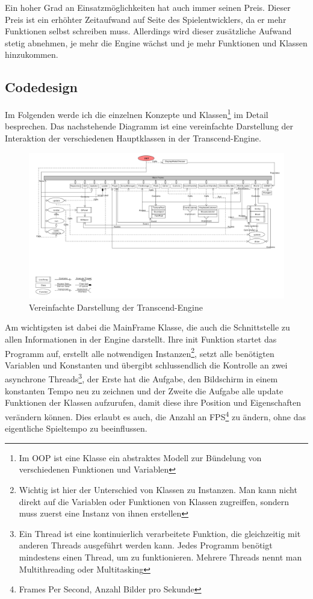 \documentclass[12pt,a4paper,titlepage]{article}
\begin{document}
		Ein hoher Grad an Einsatzmöglichkeiten hat auch immer seinen Preis. Dieser Preis ist ein erhöhter Zeitaufwand auf Seite des Spielentwicklers, da er mehr Funktionen selbst schreiben muss. Allerdings wird dieser zusätzliche Aufwand stetig abnehmen, je mehr die Engine wächst und je mehr Funktionen und Klassen hinzukommen.
		
	\subsection{Codedesign}
		Im Folgenden werde ich die einzelnen Konzepte und Klassen\footnote{Im OOP ist eine Klasse ein abstraktes Modell zur Bündelung von verschiedenen Funktionen und Variablen} im Detail besprechen. Das nachstehende Diagramm ist eine vereinfachte Darstellung der Interaktion der verschiedenen Hauptklassen in der Transcend-Engine.
		\begin{figure}[H]
  			\centering
			\includegraphics[keepaspectratio=true,angle=-90,scale=0.335]{transcend-engine.pdf}
  			\caption{Vereinfachte Darstellung der Transcend-Engine}
		\end{figure}
		Am wichtigsten ist dabei die MainFrame Klasse, die auch die Schnittstelle zu allen Informationen in der Engine darstellt. Ihre init Funktion startet das Programm auf, erstellt alle notwendigen Instanzen\footnote{Wichtig ist hier der Unterschied von Klassen zu Instanzen. Man kann nicht direkt auf die Variablen oder Funktionen von Klassen zugreiffen, sondern muss zuerst eine Instanz von ihnen erstellen}, setzt alle benötigten Variablen und Konstanten und übergibt schlussendlich die Kontrolle an zwei asynchrone Threads\footnote{Ein Thread ist eine kontinuierlich verarbeitete Funktion, die gleichzeitig mit anderen Threads ausgeführt werden kann. Jedes Programm benötigt mindestens einen Thread, um zu funktionieren. Mehrere Threads nennt man Multithreading oder Multitasking}, der Erste hat die Aufgabe, den Bildschirm in einem konstanten Tempo neu zu zeichnen und der Zweite die Aufgabe alle update Funktionen der Klassen aufzurufen, damit diese ihre Position und Eigenschaften verändern können. Dies erlaubt es auch, die Anzahl an FPS\footnote{Frames Per Second, Anzahl Bilder pro Sekunde} zu ändern, ohne das eigentliche Spieltempo zu beeinflussen.\\
		
\end{document}

